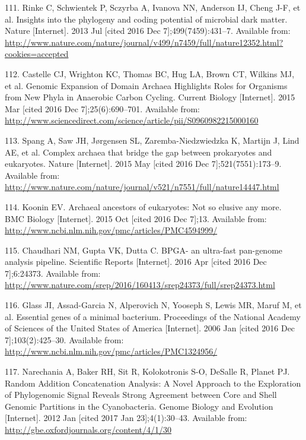 \documentclass[12pt,twoside]{reedthesis}
\begin{document}
{  \hypertarget{ref-rinke_insights_2013}{}
  111. Rinke C, Schwientek P, Sczyrba A, Ivanova NN, Anderson IJ, Cheng
  J-F, et al. Insights into the phylogeny and coding potential of
  microbial dark matter. Nature {[}Internet{]}. 2013 Jul {[}cited 2016 Dec
  7{]};499(7459):431--7. Available from:
  \url{http://www.nature.com/nature/journal/v499/n7459/full/nature12352.html?cookies=accepted}
  
  \hypertarget{ref-castelle_genomic_2015}{}
  112. Castelle CJ, Wrighton KC, Thomas BC, Hug LA, Brown CT, Wilkins MJ,
  et al. Genomic Expansion of Domain Archaea Highlights Roles for
  Organisms from New Phyla in Anaerobic Carbon Cycling. Current Biology
  {[}Internet{]}. 2015 Mar {[}cited 2016 Dec 7{]};25(6):690--701.
  Available from:
  \url{http://www.sciencedirect.com/science/article/pii/S0960982215000160}
  
  \hypertarget{ref-spang_complex_2015}{}
  113. Spang A, Saw JH, Jørgensen SL, Zaremba-Niedzwiedzka K, Martijn J,
  Lind AE, et al. Complex archaea that bridge the gap between prokaryotes
  and eukaryotes. Nature {[}Internet{]}. 2015 May {[}cited 2016 Dec
  7{]};521(7551):173--9. Available from:
  \url{http://www.nature.com/nature/journal/v521/n7551/full/nature14447.html}
  
  \hypertarget{ref-koonin_archaeal_2015}{}
  114. Koonin EV. Archaeal ancestors of eukaryotes: Not so elusive any
  more. BMC Biology {[}Internet{]}. 2015 Oct {[}cited 2016 Dec 7{]};13.
  Available from:
  \url{http://www.ncbi.nlm.nih.gov/pmc/articles/PMC4594999/}
  
  \hypertarget{ref-chaudhari_bpga-_2016}{}
  115. Chaudhari NM, Gupta VK, Dutta C. BPGA- an ultra-fast pan-genome
  analysis pipeline. Scientific Reports {[}Internet{]}. 2016 Apr {[}cited
  2016 Dec 7{]};6:24373. Available from:
  \url{http://www.nature.com/srep/2016/160413/srep24373/full/srep24373.html}
  
  \hypertarget{ref-glass_essential_2006}{}
  116. Glass JI, Assad-Garcia N, Alperovich N, Yooseph S, Lewis MR, Maruf
  M, et al. Essential genes of a minimal bacterium. Proceedings of the
  National Academy of Sciences of the United States of America
  {[}Internet{]}. 2006 Jan {[}cited 2016 Dec 7{]};103(2):425--30.
  Available from:
  \url{http://www.ncbi.nlm.nih.gov/pmc/articles/PMC1324956/}
  
  \hypertarget{ref-narechania_random_2012}{}
  117. Narechania A, Baker RH, Sit R, Kolokotronis S-O, DeSalle R, Planet
  PJ. Random Addition Concatenation Analysis: A Novel Approach to the
  Exploration of Phylogenomic Signal Reveals Strong Agreement between Core
  and Shell Genomic Partitions in the Cyanobacteria. Genome Biology and
  Evolution {[}Internet{]}. 2012 Jan {[}cited 2017 Jan 23{]};4(1):30--43.
  Available from: \url{http://gbe.oxfordjournals.org/content/4/1/30}
  
}
\end{document}

